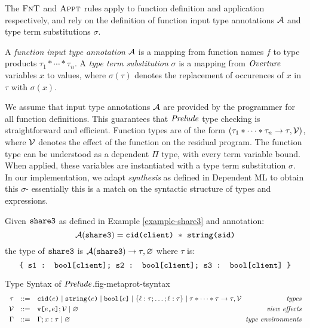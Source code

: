 The $\text{\sc FnT}$ and $\text{\sc Appt}$ rules apply to function
definition and application respectively, and rely on the
definition of function input type annotations $\mathcal{A}$ and
type term substitutions $\sigma$. 
\begin{definition}
  A \emph{function input type annotation} $\mathcal{A}$ is a mapping from
  function names $f$ to type products $\tau_1 * \cdots * \tau_n$.
  A \emph{type term substitution} $\sigma$ is a mapping from
  $\mathit{Overture}$ variables $x$ to values, where $\sigma(\tau)$ denotes
  the replacement of occurences of $x$ in $\tau$ with $\sigma(x)$. 
\end{definition}
We assume that input type annotations $\mathcal{A}$ are provided by the
programmer for all function definitions. This guarantees that
$\mathit{Prelude}$ type checking is straightforward and efficient.
Function types are of the form
$
(\tau_1 * \cdots * \tau_n \rightarrow \tau,\mathcal{V})
$,
where $\mathcal{V}$ denotes the effect of the function on the residual
program.  The function type can be understood as a dependent $\Pi$
type, with every term variable bound. When applied, these variables
are instantiated with a type term substitution $\sigma$. In our
implementation, we adapt \emph{synthesis} as defined in Dependent ML \cite{10.1145/292540.292560}
to obtain this $\sigma$- essentially this is a match on the syntactic
structure of types and expressions. 
\begin{example}
  Given $\texttt{share3}$ as defined in Example \ref{example-share3} and
  annotation:
  $$\mathcal{A}(\texttt{share3}) =  \texttt{cid(client)}\ *\ \texttt{string(sid)}$$
  the type of $\texttt{share3}$ is $\mathcal{A}(\texttt{share3}) \rightarrow \tau,\varnothing$
  where $\tau$ is:
  $$
  \texttt{\{ s1 : bool[client]; s2 : bool[client]; s3 : bool[client] \}}
  $$
\end{example}

\begin{fpfig}[t]{Type Syntax of $\mathit{Prelude}$.}{fig-metaprot-tsyntax}
  {\small
    $$
    \begin{array}{rcl@{\hspace{2mm}}r}
      \srct &::=& \cidty{e} \mid \stringty{e} \mid \bet{e} \mid  \{ \flab : \srct;\ldots;\flab : \srct \} \mid \tau * \cdots * \tau \rightarrow \tau,\viewst & \gdesc{types}\\ [1mm]
      \viewst  &::=& \view{e}{e};\viewst \mid \varnothing   & \gdesc{view effects}\\[1mm]
      \Gamma &::=& \Gamma; x : \tau \mid \varnothing & \gdesc{type environments}    
    \end{array}
    $$
  }
\end{fpfig}

